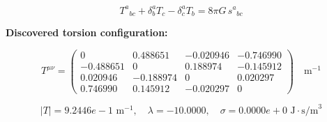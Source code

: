 
\begin{equation}
  T^a{}_{bc} + \delta^a_b T_c - \delta^a_c T_b = 8\pi G \, s^a{}_{bc}
\end{equation}

\textbf{Discovered torsion configuration:}

\begin{equation}
  T^{\mu\nu} = \begin{pmatrix}
    0 & 0.488651 & -0.020946 & -0.746990 \\
    -0.488651 & 0 & 0.188974 & -0.145912 \\
    0.020946 & -0.188974 & 0 & 0.020297 \\
    0.746990 & 0.145912 & -0.020297 & 0
  \end{pmatrix} \quad \text{m}^{-1}
\end{equation}

\begin{equation}
  |T| = 9.2446e-1 \text{ m}^{-1}, \quad
  \lambda = -10.0000, \quad
  \sigma = 0.0000e+0 \text{ J}\cdot\text{s/m}^3
\end{equation}